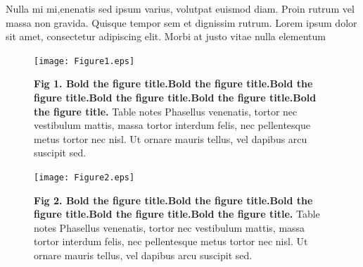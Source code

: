\documentclass[10pt,letterpaper]{article}
\begin{document}
Nulla mi mi,enenatis sed ipsum varius, volutpat euismod diam. Proin rutrum vel massa non gravida. Quisque tempor sem et dignissim rutrum. Lorem ipsum dolor sit amet, consectetur adipiscing elit. Morbi at justo vitae nulla elementum 


\begin{figure}[!h]
\begin{adjustwidth}{-2in}{0.3in} %
\centering
\texttt{[image: Figure1.eps]}
\begin{flushleft} {\bf Fig 1. Bold the figure title.Bold the figure title.Bold the figure title.Bold the figure title.Bold the figure title.Bold the figure title.}
Table notes Phasellus venenatis, tortor nec vestibulum mattis, massa tortor interdum felis, nec pellentesque metus tortor nec nisl. Ut ornare mauris tellus, vel dapibus arcu suscipit sed.
\end{flushleft}
\hypertarget{fig:fig1}{}
\end{adjustwidth}
\end{figure}

\begin{figure}[!h]
\begin{adjustwidth}{-2in}{0.3in} %
\centering
\texttt{[image: Figure2.eps]}
\begin{flushleft} {\bf Fig 2. Bold the figure title.Bold the figure title.Bold the figure title.Bold the figure title.Bold the figure title.}
Table notes Phasellus venenatis, tortor nec vestibulum mattis, massa tortor interdum felis, nec pellentesque metus tortor nec nisl. Ut ornare mauris tellus, vel dapibus arcu suscipit sed.
\end{flushleft}
\hypertarget{fig:fig2}{}
\end{adjustwidth}
\end{figure}
\end{document}
